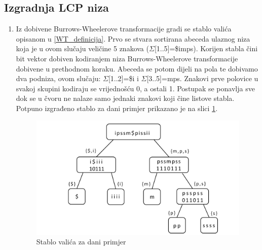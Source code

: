 \documentclass[a4paper,12pt]{article}
\begin{document}
\subsection{Izgradnja LCP niza}

\begin{enumerate}
	\item Iz dobivene Burrows-Wheelerove transformacije gradi se stablo valića opisanom u \ref{WT_definicija}. Prvo se stvara sortirana abeceda ulaznog niza koja je u ovom slučaju veličine 5 znakova ($\Sigma$[1..5]=\$imps). Korijen stabla čini bit vektor dobiven kodiranjem niza Burrows-Wheelerove transformacije dobivene u prethodnom koraku. Abeceda se potom dijeli na pola te dobivamo dva podniza, ovom slučaju: $\Sigma$[1..2]=\$i i $\Sigma$[3..5]=mps. Znakovi prve polovice u svakoj skupini kodiraju se vrijednošću 0, a ostali 1. Postupak se ponavlja sve dok se u čvoru ne nalaze samo jednaki znakovi koji čine listove stabla. Potpuno izgrađeno stablo za dani primjer prikazano je na slici \ref{fig:waveletTree}.

	\begin{figure}
		\begin{center}
			\includegraphics[width=\columnwidth]{waveletTree.png}
			\caption{Stablo valića za dani primjer}
			\label{fig:waveletTree}
		\end{center}
	\end{figure}



\end{enumerate}
\end{document}
